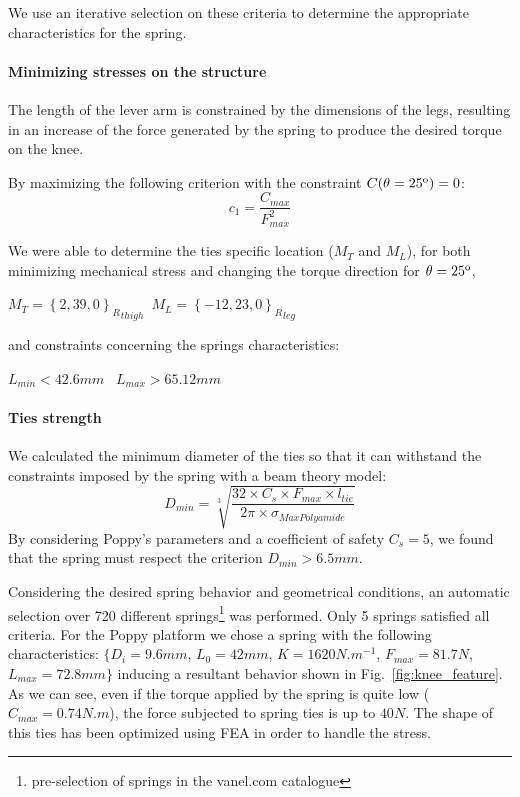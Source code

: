 We use an iterative selection on these criteria to determine the appropriate characteristics for the spring.

\paragraph{Minimizing stresses on the structure} %
\label{par:minimize_stresses_on_the_structure}

The length of the lever arm is constrained by the dimensions of the legs, resulting in an increase of the force generated by the spring to produce the desired torque on the knee.

By maximizing the following criterion with the constraint $C(\theta=25 \textsuperscript{o} ) = 0$:
\begin{equation}
     c_1 = \frac{C_{max}}{F_{max}^2}
\end{equation}

We were able to determine the ties specific location ($M_T$ and $M_L$), for both minimizing mechanical stress and changing the torque direction for $\theta = 25\textsuperscript{o}$,

{\centering
    $M_T={\left \{2,39,0 \right \}_R}_{thigh}$~$ M_L = {\left \{-12,23,0 \right \}_R}_{leg}$

}
and constraints concerning the springs characteristics:

{\centering
    $L_{min} < 42.6 mm$ ~$L_{max} > 65.12 mm$

}

\paragraph{Ties strength} %
\label{par:ties_strength}

We calculated the minimum diameter of the ties so that it can withstand the constraints imposed by the spring with a beam theory model:
\begin{equation}
    D_{min}= \sqrt[3]{ \frac{32 \times  C_s \times F_{max} \times l_{tie}}{2 \pi \times \sigma_{MaxPolyamide}} }
\end{equation}
By considering Poppy's parameters and a coefficient of safety $C_s = 5$, we
found that the spring must respect the criterion $D_{min} > 6.5 mm$.


Considering the desired spring behavior and geometrical conditions, an automatic selection over 720 different springs\footnote{pre-selection of springs in the vanel.com catalogue} was performed. Only 5 springs satisfied all criteria. For the Poppy platform we chose a spring with the following characteristics: $\{ D_i=9.6mm$, $L_0=42mm$, $K=1620N.m^{-1}$, $F_{max}=81.7 N$, $L_{max}=72.8 mm \}$ inducing a resultant behavior shown in Fig.~\ref{fig:knee_feature}. As we can see, even if the torque applied by the spring is quite low ($C_{max} = 0.74 N.m$), the force subjected to spring ties is up to $40N$. The shape of this ties has been optimized using FEA in order to handle the stress.

